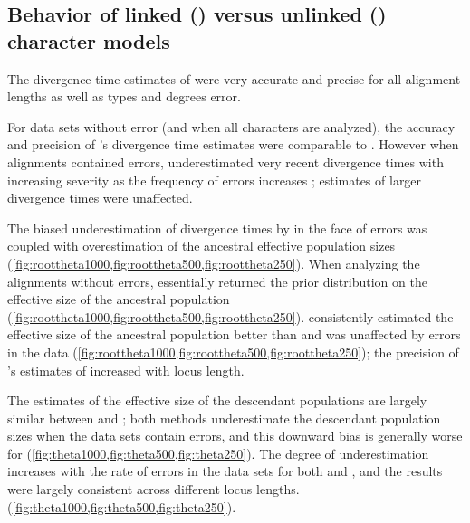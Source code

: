 \subsection{Behavior of linked (\beast) versus unlinked (\ecoevolity) character
    models}
    
The divergence time estimates of \beast were very accurate and precise for all
alignment lengths as well as types and degrees error. 

For data sets without error (and when all characters are analyzed), the
accuracy and precision of \ecoevolity's divergence time estimates were
comparable to \beast \timefigsp.
However when alignments contained errors, \ecoevolity underestimated very
recent divergence times with increasing severity as the frequency of errors
increases \timefigsp; estimates of larger divergence times were unaffected.

The biased underestimation of divergence times by \ecoevolity in the face of
errors was coupled with overestimation of the ancestral effective population
sizes (\cref{fig:roottheta1000,fig:roottheta500,fig:roottheta250}).
When analyzing the alignments without errors, \ecoevolity essentially returned
the prior distribution on the effective size of the ancestral population
(\cref{fig:roottheta1000,fig:roottheta500,fig:roottheta250}).
\beast consistently estimated the effective size of
the ancestral population better than \ecoevolity and was unaffected by errors
in the data
(\cref{fig:roottheta1000,fig:roottheta500,fig:roottheta250});
the precision of \beast's estimates of \rootpopsize increased with locus
length.

The estimates of the effective size of the descendant populations
are largely similar between \beast and \ecoevolity;
both methods underestimate the descendant population sizes when
the data sets contain errors, and this downward bias is generally
worse for \ecoevolity
(\cref{fig:theta1000,fig:theta500,fig:theta250}).
The degree of underestimation increases with the rate of errors in the data
sets for both \beast and \ecoevolity, and the results were largely consistent
across different locus lengths.
(\cref{fig:theta1000,fig:theta500,fig:theta250}).



